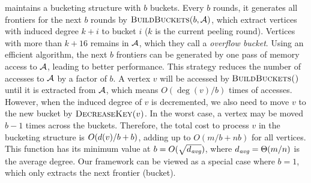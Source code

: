 \Julienne{} maintains a bucketing structure with $b$ buckets. Every $b$ rounds, it generates all frontiers for the next $b$ rounds by ${\mbox{\sc{BuildBuckets(}}}b,{\mathcal{A}}{\mbox{\sc{)}}}$,
which extract vertices with induced degree $k+i$ to bucket $i$ ($k$ is the current peeling round). 
Vertices with  more than $k+16$ remains in ${\mathcal{A}}$, which they call a \emph{overflow bucket}. 
Using an efficient algorithm, the next $b$ frontiers can be generated by one pass of memory access to ${\mathcal{A}}$, leading to better performance. 
This strategy reduces the number of accesses to ${\mathcal{A}}$ by a factor of $b$. 
A vertex $v$ will be accessed by ${\mbox{\sc{BuildBuckets(}}}{\mbox{\sc{)}}}$ until it is extracted from ${\mathcal{A}}$, which means $O(\deg(v)/b)$ times of accesses.
However, when the induced degree of $v$ is decremented, 
we also need to move $v$ to the new bucket by ${\mbox{\sc{DecreaseKey(}}}v{\mbox{\sc{)}}}$.
In the worst case, a vertex may be moved $b-1$ times across the buckets.
Therefore, the total cost to process $v$ in the bucketing structure is $O(d(v)/b+b)$, adding up to $O(m/b+nb)$ for all vertices. 
This function has its minimum value at $b=O(\sqrt{d_{\text{\it avg}}})$, where $d_{\text{\it avg}}=\Theta(m/n)$ is the average degree. 
Our framework can be viewed as a special case where $b=1$, which only extracts the next frontier (bucket). 

